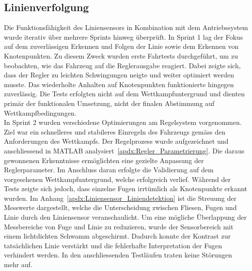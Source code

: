 \documentclass[main.tex]{subfiles} %
\begin{document}
\subsection*{Linienverfolgung}
Die Funktionsfähigkeit des Liniensensors in Kombination mit dem
Antriebssystem wurde iterativ über mehrere Sprints hinweg überprüft.
In Sprint 1 lag der Fokus auf dem zuverlässigen Erkennen und Folgen
der Linie sowie dem Erkennen von Knotenpunkten. Zu diesem Zweck
wurden erste Fahrtests durchgeführt, um zu beobachten, wie das
Fahrzeug auf die Reglerausgabe reagiert. Dabei zeigte sich, dass der
Regler zu leichten Schwingungen neigte und weiter optimiert werden
musste. Das wiederholte Anhalten auf Knotenpunkten funktionierte
hingegen zuverlässig. Die Tests erfolgten nicht auf dem
Wettkampfuntergrund und dienten primär der funktionalen Umsetzung, nicht
der finalen Abstimmung auf Wettkampfbedingungen.\\
In Sprint 2 wurden verschiedene Optimierungen am Regelsystem
vorgenommen. Ziel war ein schnelleres und stabileres Einregeln des Fahrzeugs
gemäss den Anforderungen des Wettkampfs. Der Regelprozess wurde
aufgezeichnet und anschliessend in MATLAB
analysiert~\ref{apdx:Regler_Parametrierung}.
Die daraus gewonnenen Erkenntnisse ermöglichten eine gezielte
Anpassung der Reglerparameter. Im Anschluss daran erfolgte die Validierung auf
dem vorgesehenen Wettkampfuntergrund, welche erfolgreich verlief.
Während der Tests zeigte sich jedoch, dass einzelne Fugen irrtümlich
als Knotenpunkte erkannt wurden. Im
Anhang~\ref{apdx:Liniensensor_Liniendetektion}
ist die Streuung der Messwerte dargestellt, welche die Unterscheidung
zwischen Fliesen, Fugen und Linie durch den Liniensensor veranschaulicht.
Um eine mögliche Überlappung der Messbereiche von Fuge und Linie zu
reduzieren, wurde der Sensorbereich mit einem lichtdichten Schwamm abgeschirmt.
Dadurch konnte der Kontrast zur tatsächlichen Linie verstärkt und die
fehlerhafte Interpretation der Fugen verhindert werden. In den anschliessenden
Testläufen traten keine Störungen mehr auf.
\end{document}
